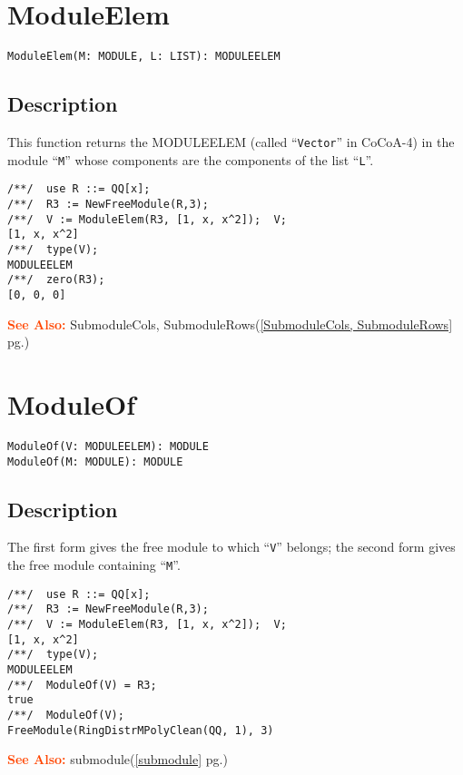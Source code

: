 \documentclass[a4paper]{mybook}
\newenvironment{command}{}{} %
\newcommand\SeeAlso{\par\textcolor{OrangeRed}{\textbf{\large See Also: }}}
\begin{document}
\section{ModuleElem}
\label{ModuleElem}
\begin{command} %


\begin{Verbatim}[label=syntax, rulecolor=\color{MidnightBlue},
frame=single]
ModuleElem(M: MODULE, L: LIST): MODULEELEM
\end{Verbatim}


\subsection*{Description}

This function returns the MODULEELEM (called ``\verb&Vector&'' in CoCoA-4)
in the module ``\verb&M&'' whose components are the components of the list ``\verb&L&''.
\begin{Verbatim}[label=example, rulecolor=\color{PineGreen}, frame=single]
/**/  use R ::= QQ[x];
/**/  R3 := NewFreeModule(R,3);
/**/  V := ModuleElem(R3, [1, x, x^2]);  V;
[1, x, x^2]
/**/  type(V);
MODULEELEM
/**/  zero(R3);
[0, 0, 0]
\end{Verbatim}


\SeeAlso %
  SubmoduleCols, SubmoduleRows(\ref{SubmoduleCols, SubmoduleRows} pg.\pageref{SubmoduleCols, SubmoduleRows})
\end{command} %

\section{ModuleOf}
\label{ModuleOf}
\begin{command} %


\begin{Verbatim}[label=syntax, rulecolor=\color{MidnightBlue},
frame=single]
ModuleOf(V: MODULEELEM): MODULE
ModuleOf(M: MODULE): MODULE
\end{Verbatim}


\subsection*{Description}

The first form gives the free module to which ``\verb&V&'' belongs;
the second form gives the free module containing ``\verb&M&''.
\begin{Verbatim}[label=example, rulecolor=\color{PineGreen}, frame=single]
/**/  use R ::= QQ[x];
/**/  R3 := NewFreeModule(R,3);
/**/  V := ModuleElem(R3, [1, x, x^2]);  V;
[1, x, x^2]
/**/  type(V);
MODULEELEM
/**/  ModuleOf(V) = R3;
true
/**/  ModuleOf(V);
FreeModule(RingDistrMPolyClean(QQ, 1), 3)
\end{Verbatim}


\SeeAlso %
  submodule(\ref{submodule} pg.\pageref{submodule})
\end{command} %
\end{document}
